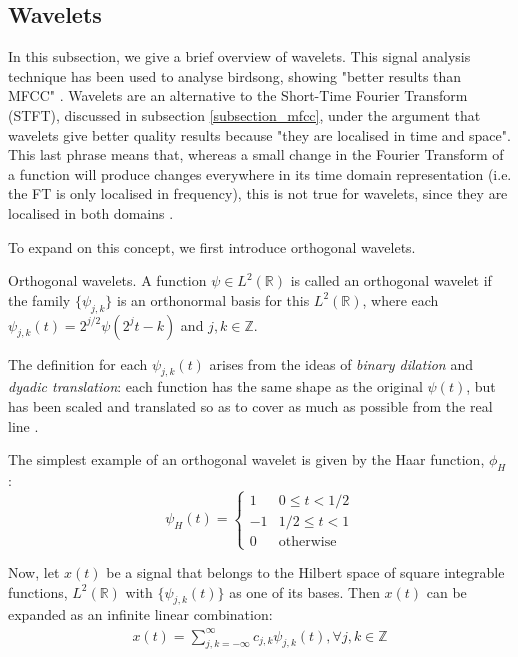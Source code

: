 \documentclass[../main.tex]{subfiles} \label{chapter_soa}
\begin{document}
\subsection{Wavelets} \label{subsection_wavelets}
In this subsection, we give a brief overview of wavelets. This signal analysis technique has been used to analyse birdsong, showing "better results than MFCC" \cite{Chou2009}. Wavelets are an alternative to the Short-Time Fourier Transform (STFT), discussed in subsection \ref{subsection_mfcc}, under the argument that wavelets give better quality results because "they are localised in time and space". This last phrase means that, whereas a small change in the Fourier Transform of a function will produce changes everywhere in its time domain representation (i.e. the FT is only localised in frequency), this is not true for wavelets, since they are localised in both domains \cite{Vidakovic1991}.
\par To expand on this concept, we first introduce orthogonal wavelets.
\begin{definition}{Orthogonal wavelets.} \label{def_onwavelets}
A function $\psi\in L^2(\mathbb{R})$ is called an orthogonal wavelet if the family $\{\psi_{j,k}\}$ is an orthonormal basis for this $L^2(\mathbb{R})$, where each $\psi_{j,k}(t) = 2^{j/2}\psi(2^jt-k)$ and $j, k \in \mathbb{Z}$.
\end{definition}
\par The definition for each $\psi_{j,k}(t)$ arises from the ideas of \emph{binary dilation} and \emph{dyadic translation}: each function has the same shape as the original $\psi(t)$, but has been scaled and translated so as to cover as much as possible from the real line \cite{Chui1992}. 
\par The simplest example of an orthogonal wavelet is given by the Haar function, $\phi_H$ \cite{Chui1992}:
\begin{displaymath}
   \psi_H(t) = \left\{
     \begin{array}{lr}
      1 & 0 \leq t < 1/2 \\
      -1 & 1/2 \leq t < 1 \\
      0 & \text{otherwise} 
     \end{array}
   \right.
\end{displaymath}
\par Now, let $x(t)$ be a signal that belongs to the Hilbert space of square integrable functions, $L^2(\mathbb{R})$ with $\{\psi_{j,k}(t)\}$ as one of its bases. Then $x(t)$ can be expanded as an infinite linear combination:
\begin{align*}
x(t) = \sum_{j,k=-\infty}^{\infty}{c_{j,k}\psi_{j,k}(t)}, \forall j,k \in \mathbb{Z}
\end{align*}
\end{document}
